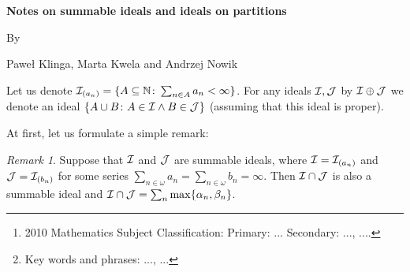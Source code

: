 \documentclass[12pt]{article}
\theoremstyle{plain}
\theoremstyle{definition}
\theoremstyle{remark}
\newtheorem*{remark}{Remark}
\newcommand{\nnatural}{\mathbb{N}}
\newcommand{\cI}{{\cal I}}
\newcommand{\cJ}{{\cal J}}
\begin{document}
\begin{center}{\bf \Large
		Notes on summable ideals and ideals on partitions
	}
\end{center}
\smallskip
\begin{center}
	By
\end{center}
\smallskip
\begin{center} Pawe\l{} Klinga, Marta Kwela and Andrzej Nowik
\end{center}

\begin{abstract}
	We consider ...
	\let\thefootnote\relax\footnote{2010 Mathematics Subject Classification:  Primary: ... Secondary: ..., ....
	}
	\let\thefootnote\relax\footnote{Key words and phrases: ..., ...}
\end{abstract}

Let us denote
  $\cI_{(a_n)} = \{ A \subseteq \nnatural\colon \sum_{n\in A} a_n < \infty\}$.
For any ideals $\cI, \cJ$ by $\cI \oplus \cJ$ we denote
an ideal $\{A \cup B\colon A \in \cI \wedge B \in \cJ\}$ 
(assuming that this ideal is proper).

At first, let us formulate a simple remark:
\begin{remark}
Suppose that $\cI$ and $\cJ$ are summable ideals, where
$\cI = \cI_{(a_n)}$ and $\cJ = \cI_{(b_n)}$ for some
series $\sum_{n\in\omega} a_n = \sum_{n\in\omega} b_n = \infty$.
Then $\cI \cap \cJ$ is also a summable ideal and
$\cI \cap \cJ = \sum_n \max\{\alpha_n,\beta_n\}$.
\end{remark}
\end{document}
